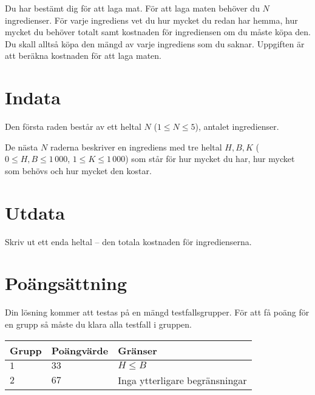 Du har bestämt dig för att laga mat.
För att laga maten behöver du $N$ ingredienser.
För varje ingrediens vet du hur mycket du redan har hemma, hur mycket du behöver totalt samt kostnaden för ingrediensen om du måste köpa den.
Du skall alltså köpa den mängd av varje ingrediens som du saknar.
Uppgiften är att beräkna kostnaden för att laga maten.

\section*{Indata}
Den första raden består av ett heltal $N$ ($1 \le N \le 5$), antalet ingredienser.

De nästa $N$ raderna beskriver en ingrediens med tre heltal $H, B, K$ ($0 \le H, B \le 1\,000$, $1 \le K \le 1\,000$) som står för hur mycket du har, hur mycket som behövs och hur mycket den kostar.

\section*{Utdata}
Skriv ut ett enda heltal -- den totala kostnaden för ingredienserna.

\section*{Poängsättning}
Din lösning kommer att testas på en mängd testfallsgrupper.
För att få poäng för en grupp så måste du klara alla testfall i gruppen.

\noindent
\begin{tabular}{| l | l | l |}
  \hline
  Grupp & Poängvärde & Gränser \\ \hline
  $1$    & $33$        &  $H \le B$ \\ \hline
  $2$    & $67$        &  Inga ytterligare begränsningar \\ \hline
\end{tabular}

